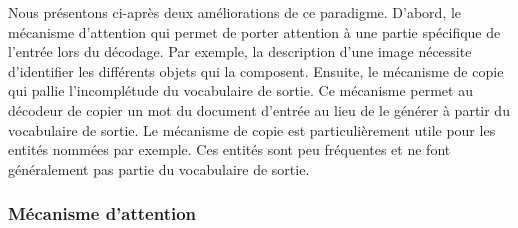Nous présentons ci-après deux améliorations de ce paradigme.
%
D'abord, le mécanisme d'attention qui permet de porter attention à une partie spécifique de l'entrée lors du décodage. Par exemple, la description d'une image nécessite d'identifier les différents objets qui la composent.
%
Ensuite, le mécanisme de copie qui pallie l'incomplétude du vocabulaire de sortie. Ce mécanisme permet au décodeur de copier un mot du document d'entrée au lieu de le générer à partir du vocabulaire de sortie. Le mécanisme de copie est particulièrement utile pour les entités nommées par exemple. Ces entités sont peu fréquentes et ne font généralement pas partie du vocabulaire de sortie.

    
    

\subsubsection{Mécanisme d'attention}
\label{sub:attention_mecanism}

